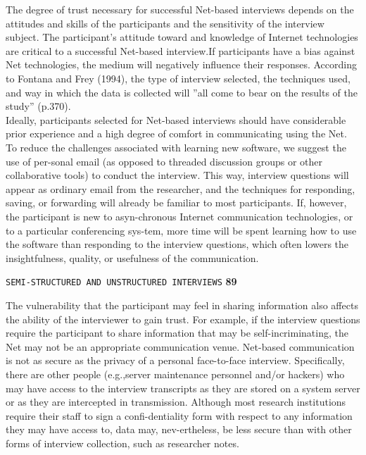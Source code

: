 \documentclass[,a49pt]{book}
\begin{document}
\hspace*{0.5cm} The degree of trust necessary for successful Net-based interviews depends on the attitudes and skills of the participants and the sensitivity of the interview subject. The participant's attitude toward and knowledge of Internet technologies are critical to a successful Net-based interview.If participants have a bias against Net technologies, the medium will negatively influence their responses. According to Fontana and Frey (1994), the type of interview selected, the techniques used, and way in which the data is collected will ''all come to bear on the results of the study'' (p.370).\\

\hspace*{0.5cm} Ideally, participants selected for Net-based interviews should have considerable prior experience and a high degree of comfort in communicating using the Net. To reduce the challenges associated with learning new software, we suggest the use of per-sonal email (as opposed to threaded discussion groups or other collaborative tools) to conduct the interview. This way, interview questions will appear as ordinary email from the researcher, and the techniques for responding, saving, or forwarding will already be familiar to most participants. If, however, the participant is new to asyn-chronous Internet communication technologies, or to a particular conferencing sys-tem, more time will be spent learning how to use the software than responding to the interview questions, which often lowers the insightfulness, quality, or usefulness of the communication.\\

\newpage
\begin{flushright}
 \texttt{SEMI-STRUCTURED AND UNSTRUCTURED INTERVIEWS} \hspace*{1cm} \textbf{89}
\end{flushright}

\vspace*{0.5cm}
\hspace*{0.5cm} The vulnerability that the participant may feel in sharing information also affects the ability of the interviewer to gain trust. For example, if the interview questions require the participant to share information that may be self-incriminating, the Net may not be an appropriate communication venue. Net-based communication is not as secure as the privacy of a personal face-to-face interview. Specifically, there are other people (e.g.,server maintenance personnel and/or hackers) who may have access to the interview transcripts as they are stored on a system server or as they are intercepted in transmission. Although most research institutions require their staff to sign a confi-dentiality form with respect to any information they may have access to, data may, nev-ertheless, be less secure than with other forms of interview collection, such as researcher notes.\\
\end{document}
